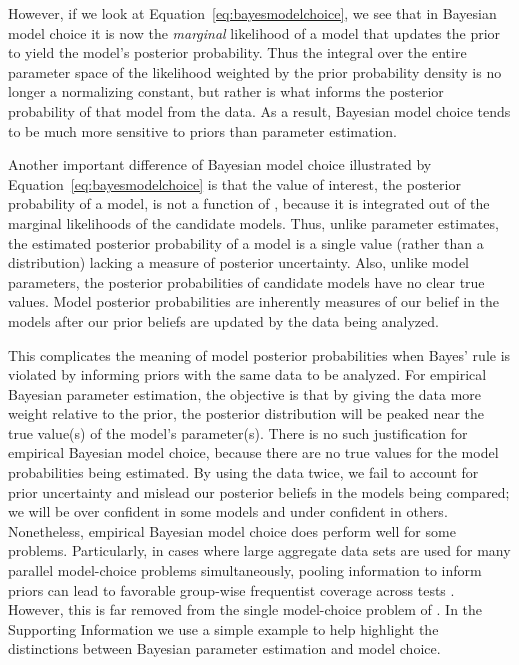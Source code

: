 
However, if we look at Equation~\ref{eq:bayesmodelchoice}, we see that in
Bayesian model choice it is now the \emph{marginal} likelihood of a model that
updates the prior to yield the model's posterior probability.
Thus the integral over the entire parameter space of the likelihood weighted by
the prior probability density is no longer a normalizing constant, but rather
is what informs the posterior probability of that model from the data.
As a result, Bayesian model choice tends to be much more sensitive to priors
than parameter estimation.

Another important difference of Bayesian model choice illustrated by
Equation~\ref{eq:bayesmodelchoice} is that the value of interest, the
posterior probability of a model, is not a function of \myTheta{}, because
it is integrated out of the marginal likelihoods of the candidate models.
Thus, unlike parameter estimates, the estimated posterior probability of a
model is a single value (rather than a distribution) lacking a measure of
posterior uncertainty.
Also, unlike model parameters, the posterior probabilities of candidate
models have no clear true values.
Model posterior probabilities are inherently measures of our belief in the
models after our prior beliefs are updated by the data being analyzed.

This complicates the meaning of model posterior probabilities when Bayes' rule
is violated by informing priors with the same data to be analyzed.
For empirical Bayesian parameter estimation, the objective is that by giving the
data more weight relative to the prior, the posterior distribution will be
peaked near the true value(s) of the model's parameter(s).
There is no such justification for empirical Bayesian model choice, because
there are no true values for the model probabilities being estimated.
By using the data twice, we fail to account for prior uncertainty and mislead
our posterior beliefs in the models being compared; we will be over confident
in some models and under confident in others.
Nonetheless, empirical Bayesian model choice does perform well for some
problems.
Particularly, in cases where large aggregate data sets are used for many
parallel model-choice problems simultaneously, pooling information to inform
priors can lead to favorable group-wise frequentist coverage across tests
\citep{Efron2008}.
However, this is far removed from the single model-choice problem of \msb.
In the Supporting Information we use a simple example to help highlight the
distinctions between Bayesian parameter estimation and model choice.


